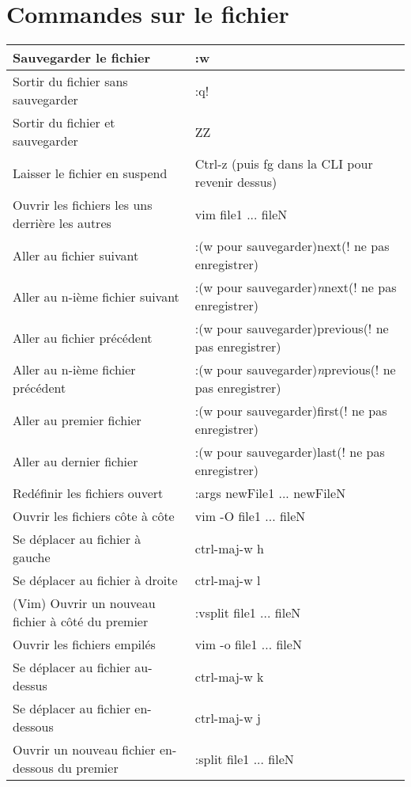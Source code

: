 \documentclass{article}
\begin{document}
\section{Commandes sur le fichier}
\begin{center}
\newline\begin{tabular}{|l l|}
    \hline
    Sauvegarder le fichier & :w \\
    \hline
    Sortir du fichier sans sauvegarder & :q! \\
    \hline
    Sortir du fichier et sauvegarder & ZZ \\
    \hline
    Laisser le fichier en suspend & Ctrl-z (puis fg dans la CLI pour revenir dessus) \\
    \hline
    Ouvrir les fichiers les uns derrière les autres & vim file1 ... fileN \\
    Aller au fichier suivant & :(w pour sauvegarder)next(! ne pas enregistrer)\\
    Aller au n-ième fichier suivant & :(w pour sauvegarder)\textit{n}next(! ne pas enregistrer) \\
    Aller au fichier précédent & :(w pour sauvegarder)previous(! ne pas enregistrer)\\
    Aller au n-ième fichier précédent & :(w pour sauvegarder)\textit{n}previous(! ne pas enregistrer) \\
    Aller au premier fichier & :(w pour sauvegarder)first(! ne pas enregistrer)\\
    Aller au dernier fichier & :(w pour sauvegarder)last(! ne pas enregistrer)\\
    Redéfinir les fichiers ouvert & :args newFile1 ... newFileN \\
    \hline
    Ouvrir les fichiers côte à côte & vim -O file1 ... fileN  \\
    Se déplacer au fichier à gauche & ctrl-maj-w h\\
    Se déplacer au fichier à droite & ctrl-maj-w l\\
    (Vim) Ouvrir un nouveau fichier à côté du premier & :vsplit file1 ... fileN \\
    \hline
    Ouvrir les fichiers empilés & vim -o file1 ... fileN \\
    Se déplacer au fichier au-dessus & ctrl-maj-w k\\
    Se déplacer au fichier en-dessous & ctrl-maj-w j\\
    Ouvrir un nouveau fichier en-dessous du premier & :split file1 ... fileN \\

\end{tabular}
\end{center}
\end{document}
